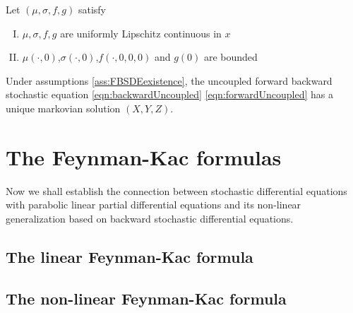 \begin{assumptions}
	\label{ass:FBSDEexistence}
	Let $(\mu,\sigma,f,g)$ satisfy
	\begin{enumerate}[I.]
		\item $\mu,\sigma,f,g$ are uniformly Lipschitz continuous in $x$
		\item $\mu(\cdot,0)$,$\sigma(\cdot,0)$,$f(\cdot,0,0,0)$ and $g(0)$ are bounded 
	\end{enumerate}
\end{assumptions}
\begin{theorem}
	Under assumptions \ref{ass:FBSDEexistence}, the uncoupled forward backward stochastic equation \eqref{eqn:backwardUncoupled} \eqref{eqn:forwardUncoupled} has a unique markovian solution $(X,Y,Z)$.
\end{theorem}
\section{The Feynman-Kac formulas}
Now we shall establish the connection between stochastic differential equations with parabolic linear partial differential equations and its non-linear generalization based on backward stochastic differential equations. 
\subsection{The linear Feynman-Kac formula}
\subsection{The non-linear Feynman-Kac formula}

 


